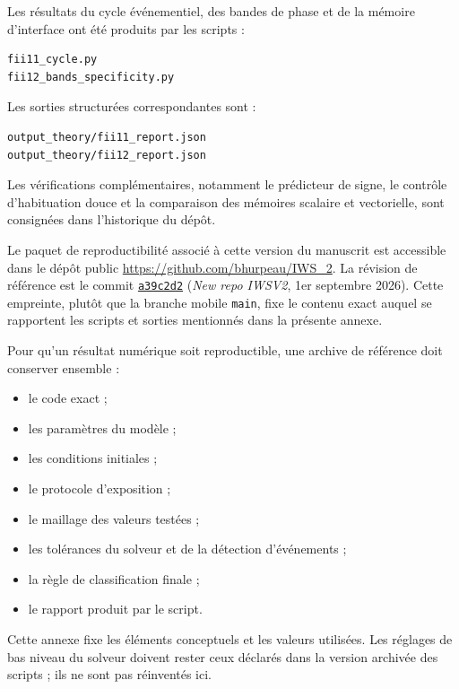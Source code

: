 Les résultats du cycle événementiel, des bandes de phase et de la
mémoire d'interface ont été produits par les scripts :

\begin{verbatim}
fii11_cycle.py
fii12_bands_specificity.py
\end{verbatim}

Les sorties structurées correspondantes sont :

\begin{verbatim}
output_theory/fii11_report.json
output_theory/fii12_report.json
\end{verbatim}

Les vérifications complémentaires, notamment le prédicteur de signe,
le contrôle d'habituation douce et la comparaison des mémoires
scalaire et vectorielle, sont consignées dans l'historique du dépôt.

Le paquet de reproductibilité associé à cette version du manuscrit est
accessible dans le dépôt public
\url{https://github.com/bhurpeau/IWS_2}. La révision de référence est le
commit \href{https://github.com/bhurpeau/IWS_2/commit/a39c2d2b6284964134fdb1052e4556ca6ae5eab3}{\texttt{a39c2d2}}
(\emph{New repo IWSV2}, 1er septembre 2026). Cette empreinte, plutôt que
la branche mobile \texttt{main}, fixe le contenu exact auquel se
rapportent les scripts et sorties mentionnés dans la présente annexe.

Pour qu'un résultat numérique soit reproductible, une archive de
référence doit conserver ensemble :

\begin{itemize}
\item le code exact ;
\item les paramètres du modèle ;
\item les conditions initiales ;
\item le protocole d'exposition ;
\item le maillage des valeurs testées ;
\item les tolérances du solveur et de la détection d'événements ;
\item la règle de classification finale ;
\item le rapport produit par le script.
\end{itemize}

Cette annexe fixe les éléments conceptuels et les valeurs utilisées.
Les réglages de bas niveau du solveur doivent rester ceux déclarés dans
la version archivée des scripts ; ils ne sont pas réinventés ici.

